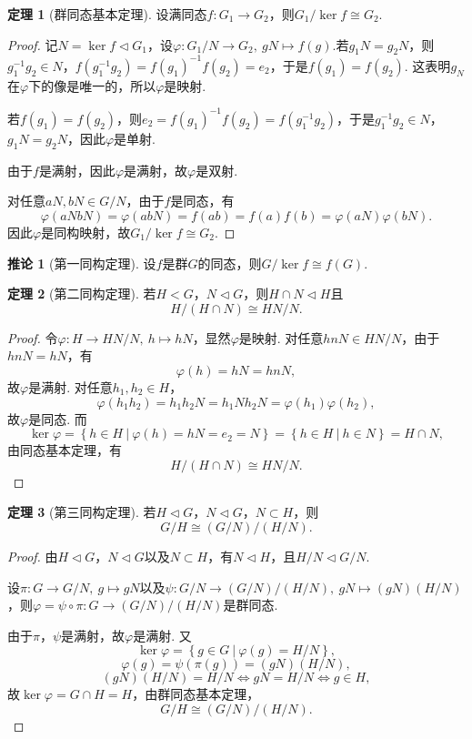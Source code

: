 \documentclass[12pt]{ctexart}
\theoremstyle{definition}
\newtheorem{theorem}{定理}
\newtheorem{corollary}{推论}
\theoremstyle{plain}
\begin{document}
	\begin{theorem}[群同态基本定理]
		设满同态$f:G_1\to G_2$，则$G_1/\ker f\cong G_2$.
	\end{theorem}
	\begin{proof}
		记$N=\ker f\lhd G_1$，设$\varphi:G_1/N\to G_2,\ gN\mapsto f(g)$.若$g_1N=g_2N$，则$g_1^{-1}g_2\in N$，$f(g_1^{-1}g_2)=f(g_1)^{-1}f(g_2)=e_2$，于是$f(g_1)=f(g_2)$. 这表明$g_N$在$\varphi$下的像是唯一的，所以$\varphi$是映射.
		
		若$f(g_1)=f(g_2)$，则$e_2=f(g_1)^{-1}f(g_2)=f(g_1^{-1}g_2)$，于是$g_1^{-1}g_2\in N$，$g_1N=g_2N$，因此$\varphi$是单射.
		
		由于$f$是满射，因此$\varphi$是满射，故$\varphi$是双射.
		
		对任意$aN,bN\in G/N$，由于$f$是同态，有
		$$\varphi(aNbN)=\varphi(abN)=f(ab)=f(a)f(b)=\varphi(aN)\varphi(bN).$$
		因此$\varphi$是同构映射，故$G_1/\ker f\cong G_2$.
	\end{proof}
	\begin{corollary}[第一同构定理]
		设$f$是群$G$的同态，则$G/\ker f\cong f(G)$.
	\end{corollary}
	\begin{theorem}[第二同构定理]
		若$H<G$，$N\lhd G$，则$H\cap N\lhd H$且
		$$H/(H\cap N)\cong HN/N.$$
	\end{theorem}
	\begin{proof}
		令$\varphi:H\to HN/N,\ h\mapsto hN$，显然$\varphi$是映射. 对任意$hnN\in HN/N$，由于$hnN=hN$，有$$\varphi(h)=hN=hnN,$$故$\varphi$是满射. 对任意$h_1,h_2\in H$，
		$$\varphi(h_1h_2)=h_1h_2N=h_1Nh_2N=\varphi(h_1)\varphi(h_2),$$
		故$\varphi$是同态. 而
		$$\ker\varphi=\left\{h\in H\ |\ \varphi(h)=hN=e_2=N\right\}=\left\{h\in H\ |\ h\in N\right\}=H\cap N,$$
		由同态基本定理，有
		$$H/(H\cap N)\cong HN/N.$$
	\end{proof}
	\begin{theorem}[第三同构定理]
		若$H\lhd G$，$N\lhd G$，$N\subset H$，则
		$$G/H\cong (G/N)/(H/N).$$
	\end{theorem}
	\begin{proof}
		由$H\lhd G$，$N\lhd G$以及$N\subset H$，有$N\lhd H$，且$H/N\lhd G/N$.
		
		设$\pi:G\to G/N,\ g\mapsto gN$以及$\psi:G/N\to(G/N)/(H/N),\ gN\mapsto (gN)(H/N)$，则$\varphi=\psi\circ\pi:G\to(G/N)/(H/N)$是群同态.
		
		由于$\pi$，$\psi$是满射，故$\varphi$是满射. 又
		$$\ker\varphi=\left\{g\in G\ |\ \varphi(g)=H/N\right\},$$
		$$\varphi(g)=\psi(\pi(g))=(gN)(H/N),$$
		$$(gN)(H/N)=H/N\iff gN=H/N\iff g\in H,$$
		故$\ker\varphi=G\cap H=H$，由群同态基本定理，
		$$G/H\cong (G/N)/(H/N).$$
	\end{proof}
\end{document}
